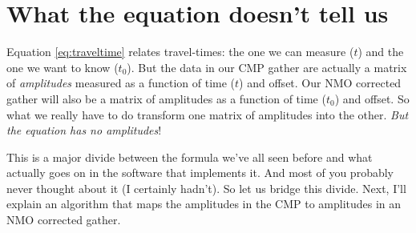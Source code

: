 \section{What the equation doesn't tell us}

Equation \ref{eq:traveltime} relates travel-times: the one we can measure ($t$)
and the one we want to know ($t_0$).
But the data in our CMP gather are actually a matrix of \textit{amplitudes}
measured as a function of time ($t$) and offset.
Our NMO corrected gather will also be a matrix of amplitudes as a function of
time ($t_0$) and offset.
So what we really have to do transform one matrix of amplitudes into the other.
\textit{But the equation has no amplitudes}!

This is a major divide between the formula we've all seen before and what
actually goes on in the software that implements it.
And most of you probably never thought about it (I certainly hadn't).
So let us bridge this divide.
Next, I'll explain an algorithm that maps the amplitudes in the CMP to
amplitudes in an NMO corrected gather.

